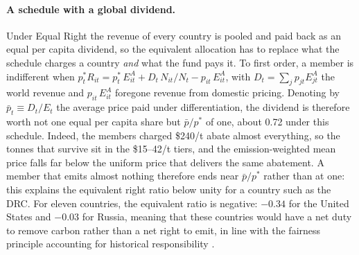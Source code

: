 \documentclass[12pt,english]{article}
\theoremstyle{remark}
\begin{document}
\paragraph{A schedule with a global dividend.} Under Equal Right the revenue of every country is pooled and paid back as an equal per capita dividend, so the equivalent allocation has to replace what the schedule charges a country \emph{and} what the fund pays it. To first order, a member is indifferent when $p^*_t R_{it} = p^*_t\,E^A_{it} + D_t\,N_{it}/N_t - p_{it}\,E^A_{it}$, with $D_t=\sum_j p_{jt}E^A_{jt}$ the world revenue and $p_{it}\,E^A_{it}$ foregone revenue from domestic pricing. %
Denoting by $\bar p_t \equiv D_t/E_t$ the average price paid under differentiation, the dividend is therefore worth not one equal per capita share but $\bar p/p^*$ of one, about 0.72 under this schedule. Indeed, the members charged \$240/t abate almost everything, so the tonnes that survive sit in the \$15--42/t tiers, and the emission-weighted mean price falls far below the uniform price that delivers the same abatement. %
A member that emits almost nothing therefore ends near $\bar p/p^*$ rather than at one: this explains the equivalent right ratio below unity for a country such as the DRC. 
For eleven countries, the equivalent ratio is negative: $-0.34$ for the United States and $-0.03$ for Russia, meaning that these countries would have a net duty to remove carbon rather than a net right to emit, in line with the fairness principle accounting for historical responsibility \citep{fanning_compensation_2023}. 
\end{document}
